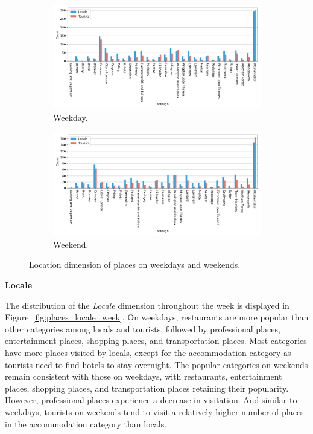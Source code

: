 \documentclass{article}
\theoremstyle{remark}
\begin{document}
\begin{figure}[!h]

\centering
\begin{subfigure}{0.6\textheight}
\centering
\includegraphics[width=0.9\linewidth]{figures/places_location_weekday.png}
\caption{Weekday.}
\label{fig:places_location_weekday}
\end{subfigure}
\begin{subfigure}{0.6\textheight}
\centering
\includegraphics[width=0.9\linewidth]{figures/places_location_weekend.png}
\caption{Weekend.}
\label{fig:places_location_weekend}
\end{subfigure}

\caption{Location dimension of places on weekdays and weekends.}
\label{fig:places_location_week}
\end{figure}


\textbf{Locale}

The distribution of the \textit{Locale} dimension throughout the week is displayed in Figure~\ref{fig:places_locale_week}. On weekdays, restaurants are more popular than other categories among locals and tourists, followed by professional places, entertainment places, shopping places, and transportation places. Most categories have more places visited by locals, except for the accommodation category as tourists need to find hotels to stay overnight. The popular categories on weekends remain consistent with those on weekdays, with restaurants, entertainment places, shopping places, and transportation places retaining their popularity. However, professional places experience a decrease in visitation. And similar to weekdays, tourists on weekends tend to visit a relatively higher number of places in the accommodation category than locals.
\end{document}
